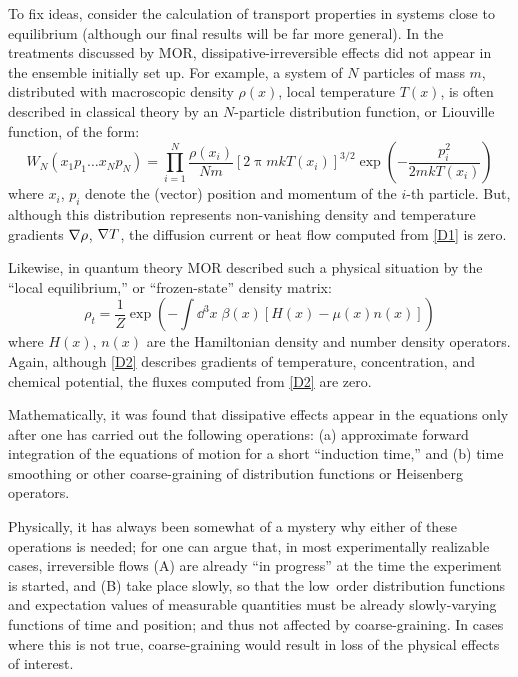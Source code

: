 To fix ideas, consider the calculation of transport properties in systems close to equilibrium (although our final results will be far more general).
In the treatments discussed by MOR, dissipative-irreversible effects did not appear in the ensemble initially set up.
For example, a system of $N$ particles of mass $m$, distributed with macroscopic density $\rho(x)$, local temperature $T(x)$, is often described in classical theory by an $N$-particle distribution function, or Liouville function, of the form:
\begin{equation}
	\label{D1}
	W_N(x_1 p_1 \ldots x_N p_N) = \prod_{i=1}^{N} \frac{\rho(x_i)}{Nm} [2\uppi m k T(x_i)]^{3/2} \exp\left(-\frac{p_i^2}{2 m k T(x_i)}\right)
\end{equation}
where $x_i$, $p_i$ denote the (vector) position and momentum of the $i$-th particle.
But, although this distribution represents non-vanishing density and temperature gradients $\mathop{}\!\nabla \rho$, $\mathop{}\!\nabla T$, the diffusion current or heat flow computed from \eqref{D1} is zero.

Likewise, in quantum theory MOR described such a physical situation by the ``local equilibrium,'' or ``frozen-state'' density matrix:
\begin{equation}
	\label{D2}
	\rho_t = \frac{1}{Z} \exp\left(-\int\! \dd^3 x\; \beta(x)\left[H(x) - \mu(x) n(x)\right] \right)
\end{equation}
where $H(x)$, $n(x)$ are the Hamiltonian density and number density operators.
Again, although \eqref{D2} describes gradients of temperature, concentration, and chemical potential, the fluxes computed from \eqref{D2} are zero.

Mathematically, it was found that dissipative effects appear in the equations only after one has carried out the following operations: (a) approximate forward integration of the equations of motion for a short ``induction time,'' and (b) time smoothing or other coarse-graining of distribution functions or Heisenberg operators.

Physically, it has always been somewhat of a mystery why either of these operations is needed; for one can argue that, in most experimentally realizable cases, irreversible flows (A) are already ``in progress'' at the time the experiment is started, and (B) take place slowly, so that the low~order distribution functions and expectation values of measurable quantities must be already slowly-varying functions of time and position; and thus not affected by coarse-graining.
In cases where this is not true, coarse-graining would result in loss of the physical effects of interest.

